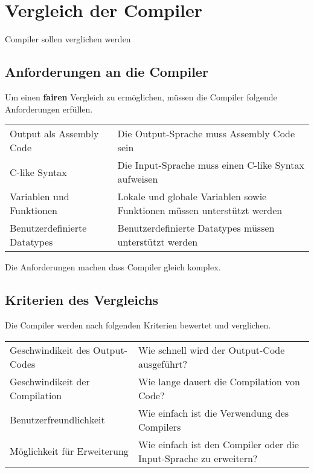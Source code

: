 \chapter{Vergleich der Compiler}
Compiler sollen verglichen werden
\section{Anforderungen an die Compiler}
Um einen \textbf{fairen} Vergleich zu ermöglichen, müssen die Compiler folgende Anforderungen erfüllen.

\begin{table}[h]
    \begin{tabular}{l|l}
    Output als Assembly Code     & Die Output-Sprache muss Assembly Code sein                               \\
    C-like Syntax                & Die Input-Sprache muss einen C-like Syntax aufweisen                     \\
    Variablen und Funktionen     & Lokale und globale Variablen sowie Funktionen müssen unterstützt werden  \\
    Benutzerdefinierte Datatypes & Benutzerdefinierte Datatypes müssen unterstützt werden                                 
    \end{tabular}
\end{table}

Die Anforderungen machen dass Compiler gleich komplex.

\section{Kriterien des Vergleichs}
Die Compiler werden nach folgenden Kriterien bewertet und verglichen.

\begin{table}[h!]
    \begin{tabular}{l|l}
    Geschwindikeit des Output-Codes     & Wie schnell wird der Output-Code ausgeführt?                      \\
    Geschwindikeit der Compilation      & Wie lange dauert die Compilation von Code?                        \\
    Benutzerfreundlichkeit              & Wie einfach ist die Verwendung des Compilers                      \\
    Möglichkeit für Erweiterung         & Wie einfach ist den Compiler oder die Input-Sprache zu erweitern?                                 
    \end{tabular}
\end{table}
